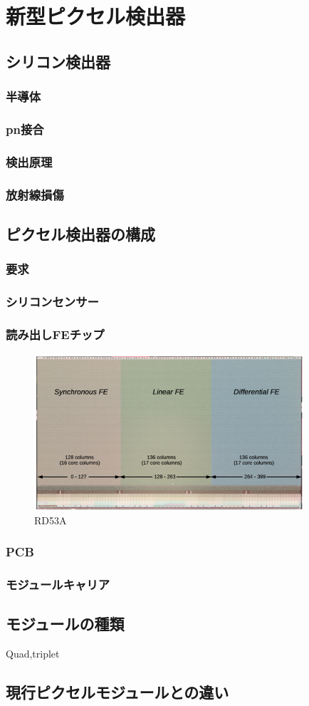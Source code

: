 \chapter{新型ピクセル検出器}

\section{シリコン検出器}
\subsection{半導体}
\subsection{pn接合}
\subsection{検出原理}
\subsection{放射線損傷}

\section{ピクセル検出器の構成}
\subsection{要求}
\subsection{シリコンセンサー}
\subsection{読み出しFEチップ}

\begin{figure}[bpt]\centering
\includegraphics[width=10cm]{fechip_rd53a}
\caption[RD53A]{RD53A\cite{2-1}}
\label{fechip_rd53a}
\end{figure}

\subsection{PCB}
\subsection{モジュールキャリア}

\section{モジュールの種類}
Quad,triplet

\section{現行ピクセルモジュールとの違い}

